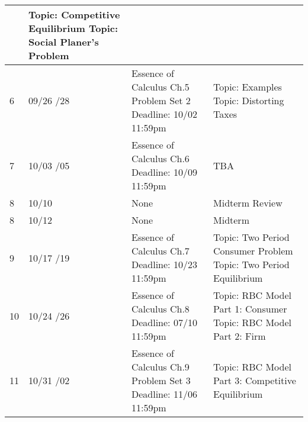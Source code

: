 \documentclass[12pt]{article}
\begin{document}
\begin{tabular}{|p{\bb}|p{\qq}|p{\rr}|p{\pp}|}
        &
        Topic: Competitive Equilibrium
        \newline
        Topic: Social Planer's Problem
    \\
    \hline
        6
        &
        09/26
        \newline
        09/28
        &
        Essence of Calculus Ch.5
        \newline
        Problem Set 2
        \newline
        Deadline: 10/02 11:59pm
        &
        Topic: Examples
        \newline
        Topic: Distorting Taxes
    \\
    \hline
        7
        &
        10/03
        \newline
        10/05
        &
        Essence of Calculus Ch.6
        \newline
        Deadline: 10/09 11:59pm
        &
        TBA
    \\
    \hline
        8
        &
        10/10
        &
        None
        &
        Midterm Review
    \\
    \hline
        8
        &
        10/12
        &
        None
        &
        Midterm
    \\
    \hline
        9
        &
        10/17
        \newline
        10/19
        &
        Essence of Calculus Ch.7
        \newline
        Deadline: 10/23 11:59pm
        &
        Topic: Two Period Consumer Problem
        \newline
        Topic: Two Period Equilibrium
    \\
    \hline
        10
        &
        10/24
        \newline
        10/26
        &
        Essence of Calculus Ch.8
        \newline
        Deadline: 07/10 11:59pm
        &
        Topic: RBC Model Part 1: Consumer
        \newline
        Topic: RBC Model Part 2: Firm
    \\
    \hline
        11
        &
        10/31
        \newline
        11/02
        &
        Essence of Calculus Ch.9
        \newline
        Problem Set 3
        \newline
        Deadline: 11/06 11:59pm
        &
        Topic: RBC Model Part 3: Competitive Equilibrium
    \\

\end{tabular}
\end{document}
